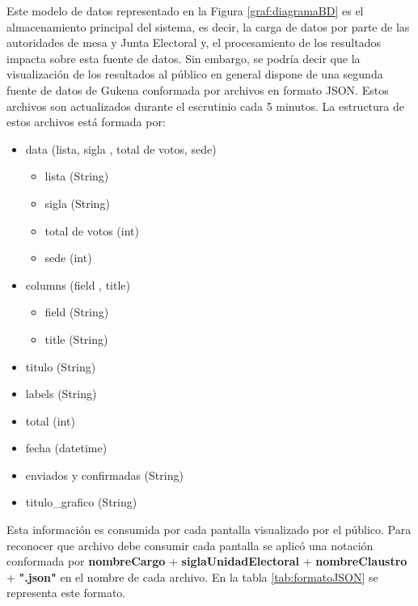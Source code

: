 Este modelo de datos representado en la Figura \ref{graf:diagramaBD} es el almacenamiento principal del sistema, es decir, la carga de datos por parte de las autoridades de mesa y Junta Electoral y, el procesamiento de los resultados impacta sobre esta fuente de datos. \newline
Sin embargo, se podría decir que la visualización de los resultados al público en general dispone de una segunda fuente de datos de Gukena conformada por archivos en formato JSON. Estos archivos son actualizados durante el escrutinio cada 5 minutos. La estructura de estos archivos está formada por:
\begin{itemize}
    \item data (lista, sigla , total de votos, sede)
    \begin{itemize}
        \item lista (String)
        \item sigla (String)
        \item total de votos (int)
        \item sede (int)
    \end{itemize}
    \item columns (field , title)
    \begin{itemize}
        \item field (String)
        \item title (String)
    \end{itemize}
    \item titulo (String)
    \item labels (String)
    \item total (int)
    \item fecha (datetime)
    \item enviados y confirmadas (String)
    \item titulo\_grafico (String)
\end{itemize}
Esta información es consumida por cada pantalla visualizado por el público. Para reconocer que archivo debe consumir cada pantalla se aplicó una notación conformada por \textbf{nombreCargo} + \textbf{siglaUnidadElectoral} + \textbf{nombreClaustro} + \textbf{".json"} en el nombre de cada archivo. En la tabla \ref{tab:formatoJSON} se representa este formato.

